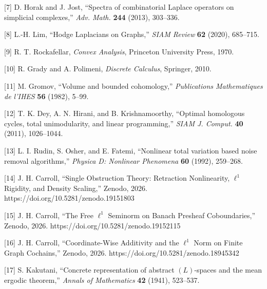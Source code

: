 \documentclass[
]{article}
\begin{document}
{[}7{]} D. Horak and J. Jost, ``Spectra of combinatorial Laplace
operators on simplicial complexes,'' \emph{Adv. Math.} \textbf{244}
(2013), 303--336.

{[}8{]} L.-H. Lim, ``Hodge Laplacians on Graphs,'' \emph{SIAM Review}
\textbf{62} (2020), 685--715.

{[}9{]} R. T. Rockafellar, \emph{Convex Analysis}, Princeton University
Press, 1970.

{[}10{]} R. Grady and A. Polimeni, \emph{Discrete Calculus}, Springer,
2010.

{[}11{]} M. Gromov, ``Volume and bounded cohomology,''
\emph{Publications Math\textquotesingle ematiques de
l'IH\textquotesingle ES} \textbf{56} (1982), 5--99.

{[}12{]} T. K. Dey, A. N. Hirani, and B. Krishnamoorthy, ``Optimal
homologous cycles, total unimodularity, and linear programming,''
\emph{SIAM J. Comput.} \textbf{40} (2011), 1026--1044.

{[}13{]} L. I. Rudin, S. Osher, and E. Fatemi, ``Nonlinear total
variation based noise removal algorithms,'' \emph{Physica D: Nonlinear
Phenomena} \textbf{60} (1992), 259--268.

{[}14{]} J. H. Carroll, ``Single Obstruction Theory: Retraction
Nonlinearity, \(\ell^1\) Rigidity, and Density Scaling,'' Zenodo, 2026.
https://doi.org/10.5281/zenodo.19151803

{[}15{]} J. H. Carroll, ``The Free \(\ell^1\) Seminorm on Banach
Presheaf Coboundaries,'' Zenodo, 2026.
https://doi.org/10.5281/zenodo.19152115

{[}16{]} J. H. Carroll, ``Coordinate-Wise Additivity and the \(\ell^1\)
Norm on Finite Graph Cochains,'' Zenodo, 2026.
https://doi.org/10.5281/zenodo.18945342

{[}17{]} S. Kakutani, ``Concrete representation of abstract
\((L)\)-spaces and the mean ergodic theorem,'' \emph{Annals of
Mathematics} \textbf{42} (1941), 523--537.
\end{document}
